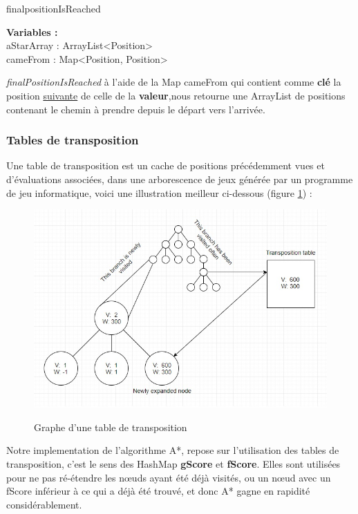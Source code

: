 \documentclass[12pt, a4paper, openany]{article}
\newcommand{\methodename}[1]{\textit{#1}}
\begin{document}
\LinesNumberedHidden
\DontPrintSemicolon
\begin{algorithm}[H]
\begin{tcolorbox}
\caption{\sc finalpositionIsReached }
\SetAlgoLined
{}
\textbf{Variables : }\\ aStarArray : ArrayList<Position> \\  cameFrom : Map<Position, Position> \\
\end{tcolorbox}
\end{algorithm}

\methodename{finalPositionIsReached} à l'aide de la Map cameFrom qui contient comme \textbf{clé} la position \underline{suivante} de celle de la \textbf{valeur},nous retourne une ArrayList de positions contenant le chemin à prendre depuis le départ vers l'arrivée.


\subsubsection{Tables de transposition}
Une table de transposition est un cache de positions précédemment vues et d'évaluations associées, dans une arborescence de jeux générée par un programme de jeu informatique, voici une illustration meilleur ci-dessous (figure \ref{fig:Table De Transposition}) :
\begin{figure}[H]
\begin{center}
\includegraphics[scale=0.25]{transpo.jpg}
\\[1cm]
\end{center}
\caption{Graphe d'une table de transposition}
\label {fig:Table De Transposition}
\end{figure}
Notre implementation de l'algorithme A*,  repose sur l'utilisation des tables de transposition, c'est le sens des HashMap \textbf{gScore} et \textbf{fScore}. Elles sont utilisées pour ne pas ré-étendre les nœuds ayant été déjà visités, ou un nœud avec un fScore inférieur à ce qui a déjà été trouvé, et donc A* gagne en rapidité considérablement.
\end{document}

